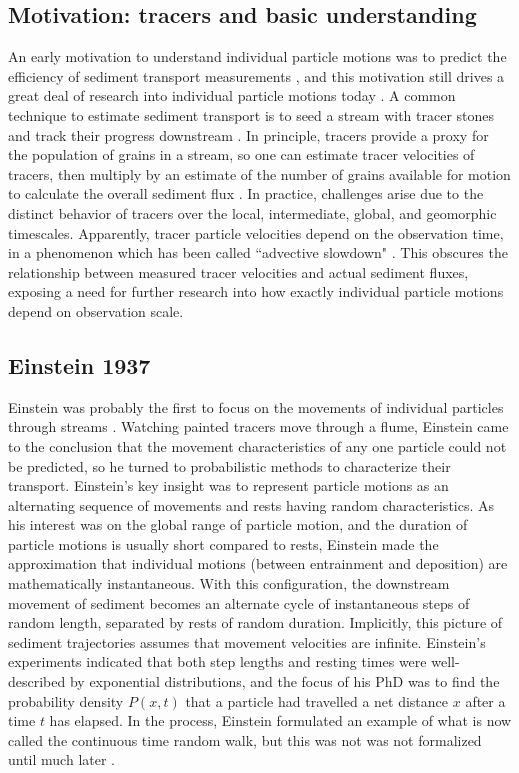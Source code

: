 \subsection{Motivation: tracers and basic understanding}
An early motivation to understand individual particle motions was to predict the efficiency of sediment transport measurements \citep{Ettema2004}, and this motivation still drives a great deal of research into individual particle motions today \citep{Hassan2017,Pretzlav2021}.
A common technique to estimate sediment transport is to seed a stream with tracer stones and track their progress downstream \citep{Einstein1937, Takayama1965, Pretzlav2021}.
In principle, tracers provide a proxy for the population of grains in a stream, so one can estimate tracer velocities of tracers, then multiply by an estimate of the number of grains available for motion to calculate the overall sediment flux \citep{Wilcock1997a,Ferguson2002}.
In practice, challenges arise due to the distinct behavior of tracers over the local, intermediate, global, and geomorphic timescales. Apparently, tracer particle velocities depend on the observation time, in a phenomenon which has been called ``advective slowdown" \citep{Ferguson2002,Haschenburger2011, Haschenburger2013}. This obscures the relationship between measured tracer velocities and actual sediment fluxes, exposing a need for further research into how exactly individual particle motions depend on observation scale.

\subsection{Einstein 1937}
Einstein was probably the first to focus on the movements of individual particles through streams \citep{Einstein1937}.
Watching painted tracers move through a flume, Einstein came to the conclusion that the movement characteristics of any one particle could not be predicted, so he turned to probabilistic methods to characterize their transport.
Einstein's key insight was to represent particle motions as an alternating sequence of movements and rests having random characteristics.
As his interest was on the global range of particle motion, and the duration of particle motions is usually short compared to rests, Einstein made the approximation that individual motions (between entrainment and deposition) are mathematically instantaneous.
With this configuration, the downstream movement of sediment becomes an alternate cycle of instantaneous steps of random length, separated by rests of random duration. 
Implicitly, this picture of sediment trajectories assumes that movement velocities are infinite.
Einstein's experiments indicated that both step lengths and resting times were well-described by exponential distributions, and the focus of his PhD was to find the probability density $P(x,t)$ that a particle had travelled a net distance $x$ after a time $t$ has elapsed. In the process, Einstein formulated an example of what is now called the continuous time random walk, but this was not was not formalized until much later \citep{Montroll1965}.


